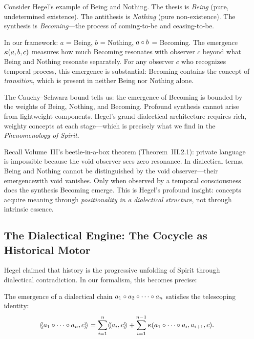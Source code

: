 \begin{interpretation}
Consider Hegel's example of Being and Nothing. The thesis is \emph{Being}
(pure, undetermined existence). The antithesis is \emph{Nothing}
(pure non-existence). The synthesis is \emph{Becoming}---the process of
coming-to-be and ceasing-to-be.

In our framework: $a$ = Being, $b$ = Nothing, $a \circ b$ = Becoming.
The emergence $\kappa(a, b, c)$ measures how much Becoming resonates with
observer $c$ beyond what Being and Nothing resonate separately. For any
observer $c$ who recognizes temporal process, this emergence is substantial:
Becoming contains the concept of \emph{transition}, which is present in
neither Being nor Nothing alone.

The Cauchy--Schwarz bound tells us: the emergence of Becoming is bounded by
the weights of Being, Nothing, and Becoming. Profound synthesis cannot arise
from lightweight components. Hegel's grand dialectical architecture requires
rich, weighty concepts at each stage---which is precisely what we find in the
\emph{Phenomenology of Spirit}.

Recall Volume~III's beetle-in-a-box theorem (Theorem~III.2.1): private language
is impossible because the void observer sees zero resonance. In dialectical
terms, Being and Nothing cannot be distinguished by the void observer---their
emergencewith void vanishes. Only when observed by a temporal consciousness
does the synthesis Becoming emerge. This is Hegel's profound insight: concepts
acquire meaning through \emph{positionality in a dialectical structure}, not
through intrinsic essence.
\end{interpretation}

\subsection{The Dialectical Engine: The Cocycle as Historical Motor}

Hegel claimed that history is the progressive unfolding of Spirit through
dialectical contradiction. In our formalism, this becomes precise:

\begin{theorem}
\label{thm:dialectical-cocycle}
The emergence of a dialectical chain $a_1 \circ a_2 \circ \cdots \circ a_n$
satisfies the telescoping identity:
\[
  \langle\!\langle a_1 \circ \cdots \circ a_n, c \rangle\!\rangle =
  \sum_{i=1}^n \langle\!\langle a_i, c \rangle\!\rangle + \sum_{i=1}^{n-1} \kappa(a_1 \circ \cdots \circ a_i, a_{i+1}, c).
\]
\end{theorem}

